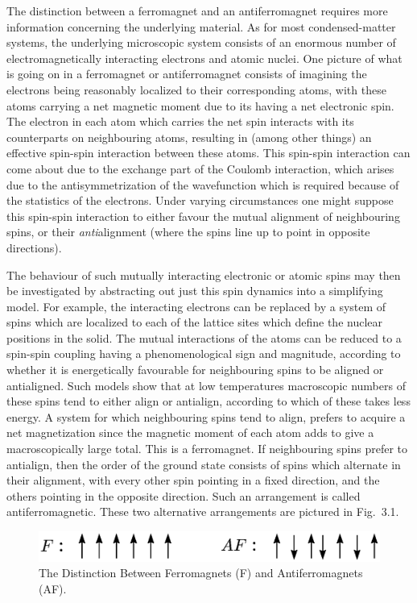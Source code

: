 \documentclass[12pt]{report}
\begin{document}
The distinction between a ferromagnet and an
antiferromagnet requires more information concerning the
underlying material. As for most condensed-matter systems,
the underlying microscopic system consists of an enormous
number of electromagnetically interacting electrons and
atomic nuclei. One picture of what is going on in a
ferromagnet or antiferromagnet consists of imagining the
electrons being reasonably localized to their corresponding
atoms, with these atoms carrying a net magnetic moment due
to its having a net electronic spin. The electron in each
atom which carries the net spin interacts with its
counterparts on neighbouring atoms, resulting in (among
other things) an effective spin-spin interaction between
these atoms. This spin-spin interaction can come about due
to the exchange part of the Coulomb interaction, which
arises due to the antisymmetrization of the wavefunction
which is required because of the statistics of the
electrons. Under varying circumstances one might suppose
this spin-spin interaction to either favour the mutual
alignment of neighbouring spins, or their {\em
anti}alignment (where the spins line up to point in
opposite directions).

The behaviour of such mutually interacting electronic or
atomic spins may then be investigated by abstracting out
just this spin dynamics into a simplifying model. For
example, the interacting electrons can be replaced by a
system of spins which are localized to each of the lattice
sites which define the nuclear positions in the solid. The
mutual interactions of the atoms can be reduced to a
spin-spin coupling having a phenomenological sign and
magnitude, according to whether it is energetically
favourable for neighbouring spins to be aligned or
antialigned. Such models show that at low temperatures
macroscopic numbers of these spins tend to either align or
antialign, according to which of these takes less energy. A
system for which neighbouring spins tend to align, prefers
to acquire a net magnetization since the magnetic moment of
each atom adds to give a macroscopically large total. This
is a ferromagnet. If neighbouring spins prefer to
antialign, then the order of the ground state consists of
spins which alternate in their alignment, with every other
spin pointing in a fixed direction, and the others pointing
in the opposite direction. Such an arrangement is called
antiferromagnetic. These two alternative arrangements are
pictured in Fig.~3.1.


\begin{figure}
\includegraphics{FvsAF.eps}
\caption{The Distinction Between Ferromagnets (F) and
Antiferromagnets (AF).}
\end{figure}
\end{document}
